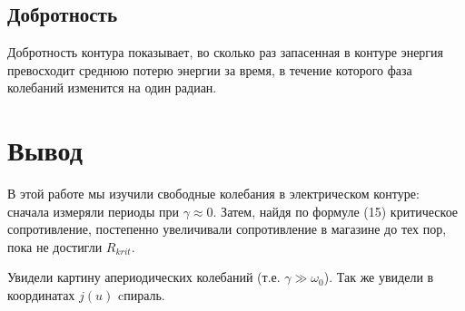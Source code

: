 \documentclass[a4paper,12pt]{article}
\begin{document}
\subsection{Добротность}
Добротность контура показывает, во сколько раз запасенная в контуре энергия превосходит среднюю потерю энергии  за время, в течение которого фаза колебаний изменится на один радиан.


\section{Вывод}

В этой работе мы изучили свободные колебания в электрическом контуре: сначала измеряли периоды при $ \gamma \approx 0 $.
Затем, найдя по формуле {(15)} критическое сопротивление, постепенно увеличивали сопротивление в магазине до тех пор, пока не достигли $R_{krit}$.

Увидели картину апериодических колебаний (т.е. ${\gamma \gg \omega_{0}}$).
\newline
Так же увидели в координатах $j(u)$ cпираль.
\end{document}
